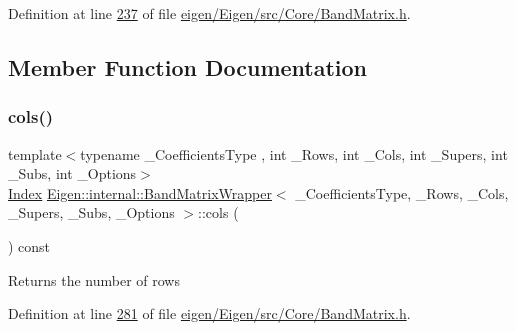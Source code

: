 Definition at line \hyperlink{eigen_2_eigen_2src_2_core_2_band_matrix_8h_source_l00237}{237} of file \hyperlink{eigen_2_eigen_2src_2_core_2_band_matrix_8h_source}{eigen/\+Eigen/src/\+Core/\+Band\+Matrix.\+h}.



\subsection{Member Function Documentation}
\mbox{\label{class_eigen_1_1internal_1_1_band_matrix_wrapper_a5c81a2138f0adfb23216de383aaeeeab}} 
\subsubsection{\texorpdfstring{cols()}{cols()}\hspace{0.1cm}{\footnotesize\ttfamily [1/2]}}
{\footnotesize\ttfamily template$<$typename \+\_\+\+Coefficients\+Type , int \+\_\+\+Rows, int \+\_\+\+Cols, int \+\_\+\+Supers, int \+\_\+\+Subs, int \+\_\+\+Options$>$ \\
\hyperlink{group___core___module_a554f30542cc2316add4b1ea0a492ff02}{Index} \hyperlink{class_eigen_1_1internal_1_1_band_matrix_wrapper}{Eigen\+::internal\+::\+Band\+Matrix\+Wrapper}$<$ \+\_\+\+Coefficients\+Type, \+\_\+\+Rows, \+\_\+\+Cols, \+\_\+\+Supers, \+\_\+\+Subs, \+\_\+\+Options $>$\+::cols (\begin{DoxyParamCaption}{ }\end{DoxyParamCaption}) const\hspace{0.3cm}{\ttfamily [inline]}}

\begin{DoxyReturn}{Returns}
the number of rows 
\end{DoxyReturn}


Definition at line \hyperlink{eigen_2_eigen_2src_2_core_2_band_matrix_8h_source_l00281}{281} of file \hyperlink{eigen_2_eigen_2src_2_core_2_band_matrix_8h_source}{eigen/\+Eigen/src/\+Core/\+Band\+Matrix.\+h}.

\mbox{\label{class_eigen_1_1internal_1_1_band_matrix_wrapper_a5c81a2138f0adfb23216de383aaeeeab}} 
